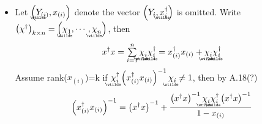 \documentclass{article}
\begin{document}
\begin{itemize}
\item Let $\left( 
\underaccent{\wtilde}{Y}%
_{\left( i\right) },x_{\left( i\right) }\right) $ denote the vector $\left(
Y_{i},%
\underaccent{\wtilde}{x}%
_{i}^{\dagger }\right) $ is omitted. Write $\left( \chi ^{\dagger }\right)
_{k\times n}=\left( 
\underaccent{\wtilde}{\chi}%
_{1},\cdots ,%
\underaccent{\wtilde}{\chi}%
_{n}\right) $, then%
\begin{equation*}
x^{\dagger }x=\tsum\limits_{i=1}^{n}%
\underaccent{\wtilde}{\chi}%
_{i}%
\underaccent{\wtilde}{\chi}%
_{i}^{\dagger }=x_{\left( i\right) }^{\dagger }x_{\left( i\right) }+%
\underaccent{\wtilde}{\chi}%
_{i}%
\underaccent{\wtilde}{\chi}%
_{i}^{\dagger }
\end{equation*}%
\newline
Assume rank($x_{\left( i\right) }$)=k\newline
if $%
\underaccent{\wtilde}{\chi}%
_{i}^{\dagger }\left( x_{\left( i\right) }^{\dagger }x_{\left( i\right)
}\right) ^{-1}%
\underaccent{\wtilde}{\chi}%
_{i}\neq 1$, then by A.18(?)%
\begin{equation*}
\left( x_{\left( i\right) }^{\dagger }x_{\left( i\right) }\right)
^{-1}=\left( x^{\dagger }x\right) ^{-1}+\frac{\left( x^{\dagger }x\right)
^{-1}%
\underaccent{\wtilde}{\chi}%
_{i}%
\underaccent{\wtilde}{\chi}%
_{i}^{\dagger }\left( x^{\dagger }x\right) ^{-1}}{1-x_{\left( i\right)
}}
\end{equation*}
\end{itemize}
\end{document}
